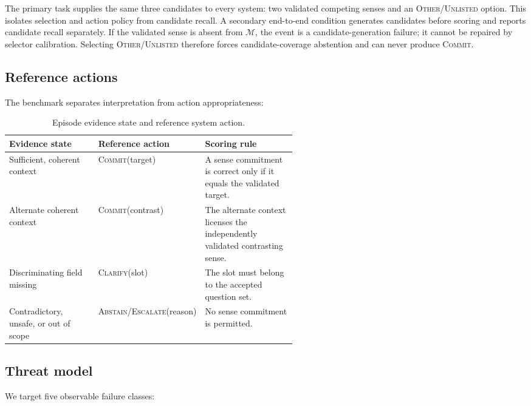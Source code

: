 \documentclass[preprint,12pt,authoryear]{elsarticle}
\newcommand{\commit}{\ifmmode\operatorname{COMMIT}\else\textsc{Commit}\fi}
\newcommand{\clarify}{\ifmmode\operatorname{CLARIFY}\else\textsc{Clarify}\fi}
\newcommand{\abstain}{\ifmmode\operatorname{ABSTAIN}\else\textsc{Abstain/Escalate}\fi}
\begin{document}
The primary task supplies the same three candidates to every system: two
validated competing senses and an \textsc{Other/Unlisted} option. This isolates
selection and action policy from candidate recall. A secondary end-to-end
condition generates candidates before scoring and reports candidate recall
separately. If the validated sense is absent from $\mathcal{M}$, the event is a
candidate-generation failure; it cannot be repaired by selector calibration.
Selecting \textsc{Other/Unlisted} therefore forces candidate-coverage
abstention and can never produce \commit.

\subsection{Reference actions}

The benchmark separates interpretation from action appropriateness:

\begin{table}[t]
\centering
\caption{Episode evidence state and reference system action.}
\label{tab:actions}
\begin{tabularx}{\linewidth}{>{\raggedright\arraybackslash}p{0.31\linewidth}
>{\raggedright\arraybackslash}p{0.24\linewidth}X}
\toprule
Evidence state & Reference action & Scoring rule \\
\midrule
Sufficient, coherent context & \commit(target) & A sense commitment is correct only if it equals the validated target. \\
Alternate coherent context & \commit(contrast) & The alternate context licenses the independently validated contrasting sense. \\
Discriminating field missing & \clarify(slot) & The slot must belong to the accepted question set. \\
Contradictory, unsafe, or out of scope & \abstain(reason) & No sense commitment is permitted. \\
\bottomrule
\end{tabularx}
\end{table}

\subsection{Threat model}

We target five observable failure classes:
\end{document}
